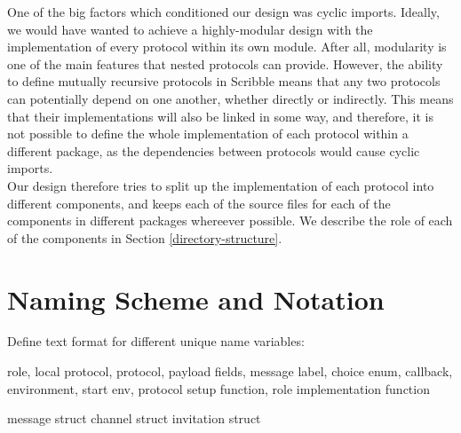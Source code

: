 \documentclass[12pt,twoside]{report}
\begin{document}
One of the big factors which conditioned our design was cyclic imports. Ideally, we would have wanted to achieve a highly-modular design with the implementation of every protocol within its own module. After all, modularity is one of the main features that nested protocols can provide. However, the ability to define mutually recursive protocols in Scribble means that any two protocols can potentially depend on one another, whether directly or indirectly. This means that their implementations will also be linked in some way, and therefore, it is not possible to define the whole implementation of each protocol within a different package, as the dependencies between protocols would cause cyclic imports.\\

Our design therefore tries to split up the implementation of each protocol into different components, and keeps each of the source files for each of the components in different packages whereever possible. We describe the role of each of the components in Section \ref{directory-structure}.






\section{Naming Scheme and Notation}\label{naming-and-notation}
Define text format for different unique name variables:

role, 
local protocol,
protocol,
payload fields,
message label,
choice enum,
callback,
environment,
start env,
protocol setup function,
role implementation function

message struct 
channel struct
invitation struct
\end{document}

